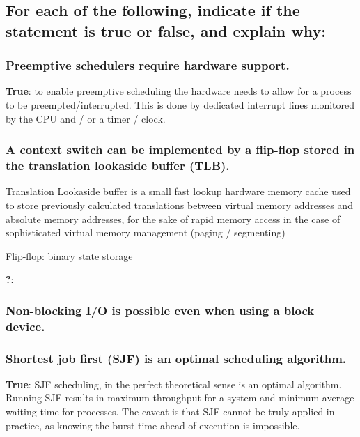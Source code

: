 \documentclass[]{article}
\begin{document}
    \subsection{For each of the following, indicate if the statement is true or false, and explain why:}

        \subsubsection{Preemptive schedulers require hardware support.}

            \textbf{True}: to enable preemptive scheduling the hardware needs to allow for a process to be preempted/interrupted. This is done by dedicated interrupt lines monitored by the CPU and / or a timer / clock.

        \subsubsection{A context switch can be implemented by a flip-flop stored in the translation lookaside buffer (TLB).}

            Translation Lookaside buffer is a small fast lookup hardware memory cache used to store previously calculated translations between virtual memory addresses and absolute memory addresses, for the sake of rapid memory access in the case of sophisticated virtual memory management (paging / segmenting)

            Flip-flop: binary state storage

            \textbf{?}:

        \subsubsection{Non-blocking I/O is possible even when using a block device.}

        \subsubsection{Shortest job first (SJF) is an optimal scheduling algorithm.}

            \textbf{True}: SJF scheduling, in the perfect theoretical sense is an optimal algorithm. Running SJF results in maximum throughput for a system and minimum average waiting time for processes. The caveat is that SJF cannot be truly applied in practice, as knowing the burst time ahead of execution is impossible.
\end{document}

